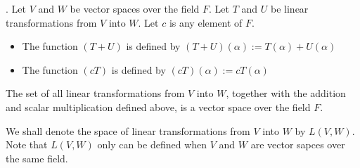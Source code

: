 \documentclass[8pt]{beamer}
\begin{document}
\begin{frame}{.}
    Let $V$ and $W$ be vector spaces over the field $F$. Let $T$ and $U$ be linear transformations from $V$ into $W$. Let $c$ is any element of $F$.

    \begin{itemize}
        \item The function $(T+U)$ is defined by $(T+U)(\alpha):= T(\alpha) + U(\alpha)$
        \item The function $(cT)$ is defined by $(cT)(\alpha):= cT(\alpha)$
    \end{itemize}

    \begin{theorem}
        The set of all linear transformations from $V$ into $W$, together with the addition and scalar multiplication defined above, is a vector space over the field $F$.
    \end{theorem}

    We shall denote the space of linear transformations from $V$ into $W$ by $L(V,W)$. Note that $L(V,W)$ only can be defined when $V$ and $W$ are vector sapces over the same field.
\end{frame}
\end{document}
